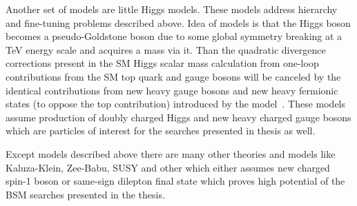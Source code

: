 Another set of models are little Higgs models.
These models address hierarchy and fine-tuning problems described above.
Idea of models is that the Higgs boson becomes a pseudo-Goldstone boson due to some global symmetry breaking at a TeV energy scale and acquires a mass via it.
Than the quadratic divergence corrections present in the SM Higgs scalar mass calculation from one-loop contributions from the SM top quark and gauge bosons will be canceled 
by the identical contributions from new heavy gauge bosons and new heavy fermionic states (to oppose the top contribution) introduced by the model~\cite{Han:2003wu,Brak}.
These models assume production of doubly charged Higgs and new heavy charged gauge bosons which are particles of interest for the searches presented in thesis as well.

Except models described above there are many other theories and models like Kaluza-Klein, Zee-Babu, SUSY and other which either assumes new charged spin-1 boson or same-sign dilepton final state which proves high potential of the BSM searches presented in the thesis.

